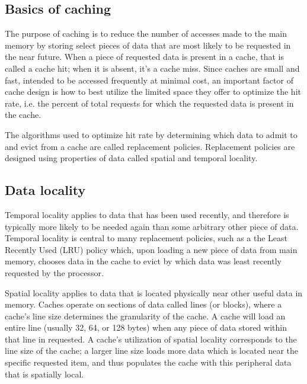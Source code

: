 \documentclass[12pt,twoside]{reedthesis}
\begin{document}
	\subsection*{Basics of caching}
	
	The purpose of caching is to reduce the number of accesses made to the main memory by storing select pieces of data that are most likely to be requested in the near future. When a piece of requested data is present in a cache, that is called a cache hit; when it is absent, it's a cache miss. Since caches are small and fast, intended to be accessed frequently at minimal cost, an important factor of cache design is how to best utilize the limited space they offer to optimize the hit rate, i.e. the percent of total requests for which the requested data is present in the cache.
	
	The algorithms used to optimize hit rate by determining which data to admit to and evict from a cache are called replacement policies. Replacement policies are designed using properties of data called spatial and temporal locality.

	\subsection*{Data locality}
	
	Temporal locality applies to data that has been used recently, and therefore is typically more likely to be needed again than some arbitrary other piece of data. Temporal locality is central to many replacement policies, such as a the Least Recently Used (LRU) policy which, upon loading a new piece of data from main memory, chooses data in the cache to evict by which data was least recently requested by the processor.
	
	Spatial locality applies to data that is located physically near other useful data in memory. Caches operate on sections of data called lines (or blocks), where a cache's line size determines the granularity of the cache. A cache will load an entire line (usually 32, 64, or 128 bytes) when any piece of data stored within that line in requested. A cache's utilization of spatial locality corresponds to the line size of the cache; a larger line size loads more data which is located near the specific requested item, and thus populates the cache with this peripheral data that is spatially local.

\end{document}
